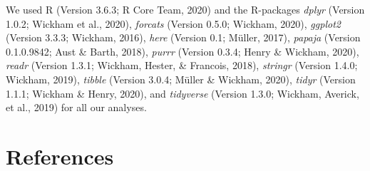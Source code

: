 \documentclass[
  man,mask,floatsintext]{apa6}
\begin{document}
We used R (Version 3.6.3; R Core Team, 2020) and the R-packages \emph{dplyr} (Version 1.0.2; Wickham et al., 2020), \emph{forcats} (Version 0.5.0; Wickham, 2020), \emph{ggplot2} (Version 3.3.3; Wickham, 2016), \emph{here} (Version 0.1; Müller, 2017), \emph{papaja} (Version 0.1.0.9842; Aust \& Barth, 2018), \emph{purrr} (Version 0.3.4; Henry \& Wickham, 2020), \emph{readr} (Version 1.3.1; Wickham, Hester, \& Francois, 2018), \emph{stringr} (Version 1.4.0; Wickham, 2019), \emph{tibble} (Version 3.0.4; Müller \& Wickham, 2020), \emph{tidyr} (Version 1.1.1; Wickham \& Henry, 2020), and \emph{tidyverse} (Version 1.3.0; Wickham, Averick, et al., 2019) for all our analyses.

\newpage

\hypertarget{references}{%
\section{References}\label{references}}

\begingroup
\setlength{\parindent}{-0.5in}
\setlength{\leftskip}{0.5in}
\end{document}
